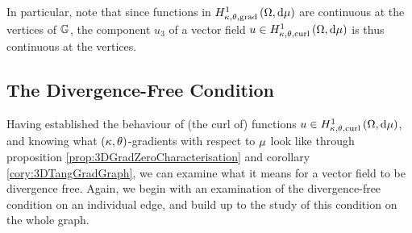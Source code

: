 In particular, note that since functions in $H^1_{\kappa,\theta,\mathrm{grad}}\left( \Omega, \mathrm{d}\mu \right)$ are continuous at the vertices of $\mathbb{G}$, the component $u_3$ of a vector field $u\in H^1_{\kappa,\theta,\mathrm{curl}}\left( \Omega, \mathrm{d}\mu \right)$ is thus continuous at the vertices.

\subsection{The Divergence-Free Condition} \label{apps:DivFreeEdge}
Having established the behaviour of (the curl of) functions $u\in H^1_{\kappa,\theta,\mathrm{curl}}\left( \Omega, \mathrm{d}\mu \right)$, and knowing what $\left( \kappa, \theta \right)$-gradients with respect to $\mu$ look like through proposition \ref{prop:3DGradZeroCharacterisation} and corollary \ref{cory:3DTangGradGraph}, we can examine what it means for a vector field to be divergence free.
Again, we begin with an examination of the divergence-free condition on an individual edge, and build up to the study of this condition on the whole graph.

